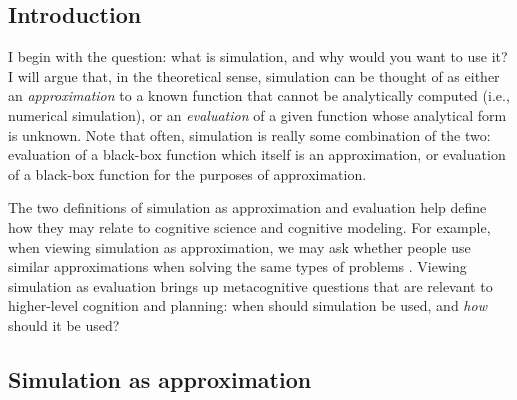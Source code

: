 \documentclass[12pt]{article}
\begin{document}

\subsection*{Introduction}

I begin with the question: what is simulation, and why would you want to use it? I will argue that, in the theoretical sense, simulation can be thought of as either an \textit{approximation} to a known function that cannot be analytically computed (i.e., numerical simulation), or an \textit{evaluation} of a given function whose analytical form is unknown. Note that often, simulation is really some combination of the two: evaluation of a black-box function which itself is an approximation, or evaluation of a black-box function for the purposes of approximation.

The two definitions of simulation as approximation and evaluation help define how they may relate to cognitive science and cognitive modeling. For example, when viewing simulation as approximation, we may ask whether people use similar approximations when solving the same types of problems \citep{Griffiths2015}. Viewing simulation as evaluation brings up metacognitive questions that are relevant to higher-level cognition and planning: when should simulation be used, and \textit{how} should it be used?

\subsection*{Simulation as approximation}
\end{document}
